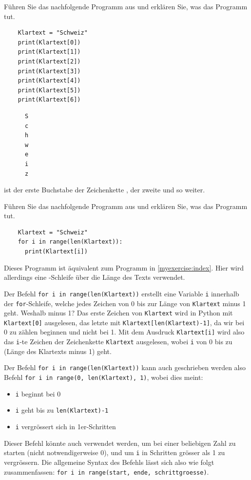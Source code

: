 \begin{myexercise}\label{myexercise:index}
  Führen Sie das nachfolgende Programm aus und erklären Sie, was das Programm tut.
  \begin{lstlisting}
    Klartext = "Schweiz"
    print(Klartext[0])
    print(Klartext[1])
    print(Klartext[2])
    print(Klartext[3])
    print(Klartext[4])
    print(Klartext[5])
    print(Klartext[6])
  \end{lstlisting}
  \begin{myanswer}
    \begin{lstlisting}
      S
      c
      h
      w
      e
      i
      z
    \end{lstlisting}
     ist der erste Buchstabe der Zeichenkette ,  der zweite und so weiter.
  \end{myanswer}
\end{myexercise}

\begin{myexercise}
  Führen Sie das nachfolgende Programm aus und erklären Sie, was das Programm tut.
  \begin{lstlisting}
    Klartext = "Schweiz"
    for i in range(len(Klartext)):
      print(Klartext[i])
  \end{lstlisting}
  \begin{myanswer}
    Dieses Programm ist äquivalent zum Programm in \cref{myexercise:index}. 
    Hier wird allerdings eine -Schleife über die Länge des Texts verwendet.
  \end{myanswer}
\end{myexercise}

Der Befehl \lstinline|for i in range(len(Klartext))| erstellt eine Variable \lstinline|i| innerhalb der \lstinline|for|-Schleife, welche jedes Zeichen von 0 bis zur Länge von \lstinline|Klartext| minus 1 geht. Weshalb minus 1? Das erste Zeichen von \lstinline|Klartext| wird in Python mit \lstinline|Klartext[0]| ausgelesen, das letzte mit \lstinline|Klartext[len(Klartext)-1]|, da wir bei 0 zu zählen beginnen und nicht bei 1. Mit dem Ausdruck \lstinline|Klartext[i]| wird also das \lstinline|i|-te Zeichen der Zeichenkette \lstinline|Klartext| ausgelesen, wobei \lstinline|i| von 0 bis zu (Länge des Klartexts minus 1) geht. 

Der Befehl \lstinline|for i in range(len(Klartext))| kann auch geschrieben werden also Befehl \lstinline|for i in range(0, len(Klartext), 1)|, wobei dies meint:
\begin{itemize}
\item \lstinline|i| beginnt bei 0
\item \lstinline|i| geht bis zu \lstinline|len(Klartext)-1|
\item \lstinline|i| vergrössert sich in 1er-Schritten
\end{itemize}
Dieser Befehl könnte auch verwendet werden, um bei einer beliebigen Zahl zu starten (nicht notwendigerweise 0), und um \lstinline|i| in Schritten grösser als 1 zu vergrössern. Die allgemeine Syntax des Befehls lässt sich also wie folgt zusammenfassen: \lstinline|for i in range(start, ende, schrittgroesse)|.

